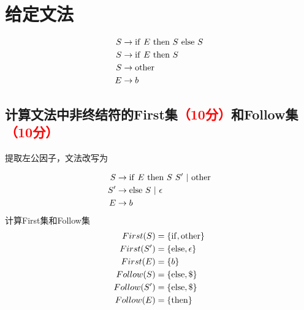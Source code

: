 \documentclass[a4paper,12pt]{article}
\begin{document}
\section{给定文法}
\begin{equation*}
    \begin{aligned}
        S & \to {\rm if}\  E\  {\rm then}\  S \  {\rm else} \  S \\
        S & \to {\rm if}\  E\  {\rm then}\  S                    \\
        S & \to {\rm other}                                      \\
        E & \to b                                                \\
    \end{aligned}
\end{equation*}

\subsection{计算文法中非终结符的First集\textcolor{red}{（10分）}和Follow集\textcolor{red}{（10分）}}

提取左公因子，文法改写为

\begin{equation*}
    \begin{aligned}
        S  & \to {\rm if}\  E\  {\rm then}\  S \  S' \  | \  {\rm other} \\
        S' & \to {\rm else} \  S \  | \  \epsilon                        \\
        E  & \to b                                                       \\
    \end{aligned}
\end{equation*}
计算First集和Follow集
\begin{equation*}
    \begin{aligned}
        First(S)   & = \{{\rm if}, {\rm other}\} \\
        First(S')  & = \{{\rm else}, \epsilon \} \\
        First(E)   & = \{b\}                     \\
        Follow(S)  & = \{{\rm else}, \$ \}       \\
        Follow(S') & = \{{\rm else}, \$ \}       \\
        Follow(E)  & = \{ {\rm then} \}          \\
    \end{aligned}
\end{equation*}
\end{document}
